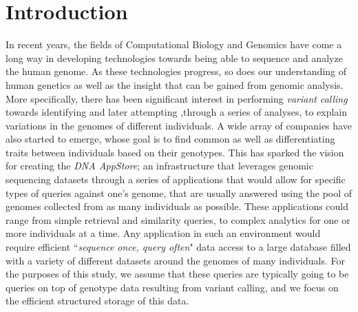 \documentclass[conference,twocolumn,10pt]{IEEEtran}
\begin{document}
\section{Introduction}
In recent years, the fields of Computational Biology and Genomics have come a long way in developing technologies towards being able to sequence and analyze the human genome. As these technologies progress, so does our understanding of human genetics as well as the insight that can be gained from genomic analysis. More specifically, there has been significant interest in performing \textit{variant calling} towards identifying and later attempting ,through a series of analyses, to explain variations in the genomes of different individuals. A wide array of companies have also started to emerge, whose goal is to find common as well as differentiating traits between individuals based on their genotypes. This has sparked the vision for creating the \textit{DNA AppStore}; an infrastructure that leverages genomic sequencing datasets through a series of applications that would allow for specific types of queries against one's genome, that are usually answered using the pool of genomes collected from as many individuals as possible. These applications could range from simple retrieval and similarity queries, to complex analytics for one or more individuals at a time. Any application in such an environment would require efficient ``\textit{sequence once, query often}" data access to a large database filled with a variety of different datasets around the genomes of many individuals. For the purposes of this study, we assume that these queries are typically going to be queries on top of genotype data resulting from variant calling, and we focus on the efficient structured storage of this data.
\end{document}
